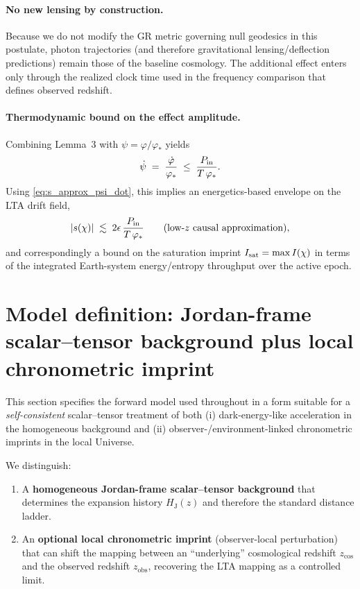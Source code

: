 \documentclass[10pt]{article}
\newcommand{\zobs}{z_{\mathrm{obs}}}
\newcommand{\zcos}{z_{\mathrm{cos}}}
\newcommand{\HJ}{H_{\mathrm{J}}}
\begin{document}
\paragraph{No new lensing by construction.}
Because we do not modify the GR metric governing null geodesics in this postulate, photon
trajectories (and therefore gravitational lensing/deflection predictions) remain those of the
baseline cosmology. The additional effect enters only through the realized clock time used in the
frequency comparison that defines observed redshift.

\paragraph{Thermodynamic bound on the effect amplitude.}
Combining Lemma~3 with $\psi=\varphi/\varphi_\ast$ yields
\begin{equation}
\dot\psi \;=\;\frac{\dot\varphi}{\varphi_\ast}\;\le\;\frac{P_{\rm in}}{T\,\varphi_\ast}.
\label{eq:psi_dot_bound}
\end{equation}
Using \eqref{eq:s_approx_psi_dot}, this implies an energetics-based envelope on the LTA drift field,
\begin{equation}
|s(\chi)| \;\lesssim\; 2\epsilon\,\frac{P_{\rm in}}{T\,\varphi_\ast}
\qquad (\text{low-$z$ causal approximation}),
\label{eq:s_energy_bound_chrono}
\end{equation}
and correspondingly a bound on the saturation imprint $I_{\rm sat}=\max I(\chi)$ in terms of the
integrated Earth-system energy/entropy throughput over the active epoch.


\section{Model definition: Jordan-frame scalar--tensor background plus local chronometric imprint}
\label{sec:model}

This section specifies the forward model used throughout in a form suitable for a
\emph{self-consistent} scalar--tensor treatment of both (i) dark-energy-like acceleration in the
homogeneous background and (ii) observer-/environment-linked chronometric imprints in the local
Universe.

We distinguish:
\begin{enumerate}[leftmargin=1.2em]
\item A \textbf{homogeneous Jordan-frame scalar--tensor background} that determines the expansion
history $\HJ(z)$ and therefore the standard distance ladder.
\item An \textbf{optional local chronometric imprint} (observer-local perturbation) that can shift
the mapping between an ``underlying'' cosmological redshift $\zcos$ and the observed redshift $\zobs$,
recovering the LTA mapping as a controlled limit.
\end{enumerate}
\end{document}
